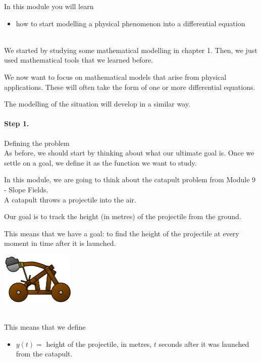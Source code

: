 In this module you will learn
\begin{itemize}
	\item how to start modelling a physical phenomenon into a differential equation
\end{itemize}

\hfill \\


We started by studying some mathematical modelling in chapter 1. Then, we just used mathematical tools that we learned before. 

We now want to focus on mathematical models that arise from physical applications. These will often take the form of one or more differential equations.

The modelling of the situation will develop in a similar way.


\paragraph{Step 1.} Defining the problem \\

As before, we should start by thinking about what our ultimate goal is. 
Once we settle on a goal, we define it as the function we want to study.

\begin{example}

\begin{minipage}{.7\textwidth}
In this module, we are going to think about the catapult problem from Module 9 - Slope Fields. \\

A catapult throws a projectile into the air.

Our goal is to track the height (in metres) of the projectile from the ground.

This means that we have a goal: to find the height of the projectile at every moment in time after it is launched.
\end{minipage}\hfill
\begin{minipage}{100pt}
	\includegraphics*[width=100pt]{images/module9-catapult.pdf}	
\end{minipage}
\hfill \\[10pt]

This means that we define
\begin{itemize}
	\item $y(t) = $ height of the projectile, in metres, $t$ seconds after it was launched from the catapult.
\end{itemize}

\end{example}

